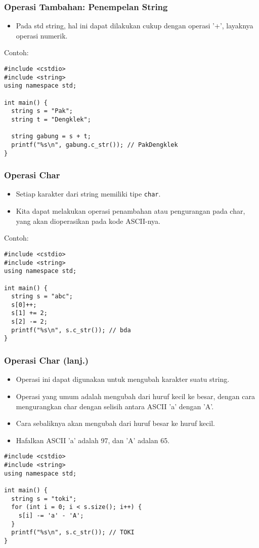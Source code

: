 \begin{frame}[fragile]
\frametitle{Operasi Tambahan: Penempelan String}
\begin{itemize}
  \item Pada std string, hal ini dapat dilakukan cukup dengan operasi '+', layaknya operasi numerik.
\end{itemize}
Contoh:
\begin{lstlisting}
#include <cstdio>
#include <string>
using namespace std;

int main() {
  string s = "Pak";
  string t = "Dengklek";

  string gabung = s + t;
  printf("%s\n", gabung.c_str()); // PakDengklek
}
\end{lstlisting}
\end{frame}

\begin{frame}[fragile]
\frametitle{Operasi Char}
\begin{itemize}
  \item Setiap karakter dari string memiliki tipe \texttt{char}.
  \item Kita dapat melakukan operasi penambahan atau pengurangan pada char, yang akan dioperasikan pada kode ASCII-nya.
\end{itemize}

Contoh:
\begin{lstlisting}
#include <cstdio>
#include <string>
using namespace std;

int main() {
  string s = "abc";
  s[0]++;
  s[1] += 2;
  s[2] -= 2;
  printf("%s\n", s.c_str()); // bda
}
\end{lstlisting}
\end{frame}

\begin{frame}[fragile]
\frametitle{Operasi Char (lanj.)}
\begin{itemize}
  \item Operasi ini dapat digunakan untuk mengubah karakter suatu string.
  \item Operasi yang umum adalah mengubah dari huruf kecil ke besar, dengan cara mengurangkan char dengan selisih antara ASCII 'a' dengan 'A'.
  \item Cara sebaliknya akan mengubah dari huruf besar ke huruf kecil.
  \item Hafalkan ASCII 'a' adalah 97, dan 'A' adalan 65.
\end{itemize}
\begin{lstlisting}
#include <cstdio>
#include <string>
using namespace std;

int main() {
  string s = "toki";
  for (int i = 0; i < s.size(); i++) {
    s[i] -= 'a' - 'A';
  }
  printf("%s\n", s.c_str()); // TOKI
}
\end{lstlisting}
\end{frame}

